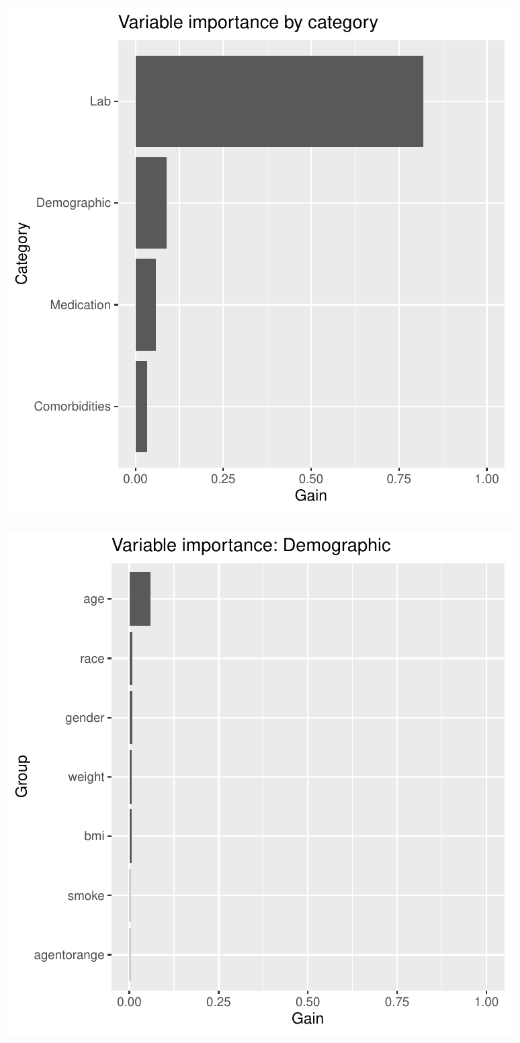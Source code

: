 \documentclass[12pt]{article}
\begin{document}
\begin{center}
\includegraphics[width=\textwidth]{figures/vi_cat.pdf}
\end{center}
\begin{center}
\includegraphics[width=\textwidth]{figures/vi_group_Demographic_.pdf}
\end{center}
\end{document}
